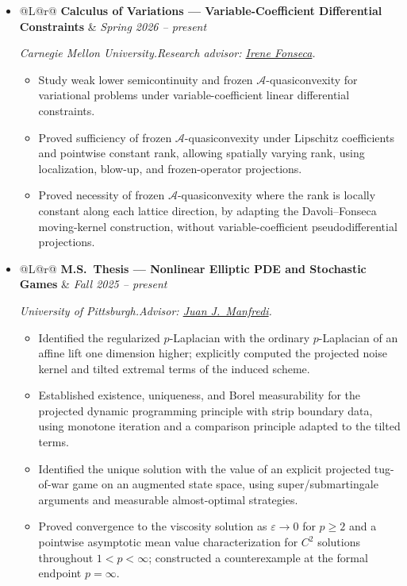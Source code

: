 \documentclass[11pt,letterpaper]{article}
\makeatletter
\newenvironment{cventries}
  {\begin{itemize}[label={},leftmargin=0pt,itemsep=0.40em,topsep=0.30em,
                   parsep=0pt,partopsep=0pt]}
  {\end{itemize}}
\newenvironment{cvbullets}
  {\begin{itemize}[label=\raisebox{0.20ex}{\scriptsize$\bullet$},
                   leftmargin=1.5em,itemsep=0.20em,topsep=0.22em,
                   parsep=0pt,partopsep=0pt]}
  {\end{itemize}}
\newcommand{\cvline}[2]{%
  \begin{tabularx}{\linewidth}{@{}L@{\hspace{1.5em}}r@{}}
    #1 & #2
  \end{tabularx}\par}
\newcommand{\factsep}{\hspace{0.6em}}
\newcommand{\roleentry}[3]{%
  \item \cvline{\textbf{#1}}{\textit{#2}}%
        \vspace{0.12em}\par{\small\sloppy\textit{#3}}\par}
\makeatother
\begin{document}
\begin{cventries}
  \roleentry{Calculus of Variations --- Variable-Coefficient Differential Constraints}
            {Spring 2026 -- present}
            {Carnegie Mellon University.\factsep Research advisor:
             \href{https://irenefonseca.weebly.com}{Irene Fonseca}.}
\begin{cvbullets}
  \item Study weak lower semicontinuity and frozen
        $\mathscr{A}$-quasiconvexity for variational problems under
        variable-coefficient linear differential constraints.
  \item Proved sufficiency of frozen $\mathscr{A}$-quasiconvexity
        under Lipschitz coefficients and pointwise constant rank,
        allowing spatially varying rank, using localization,
        blow-up, and frozen-operator projections.
  \item Proved necessity of frozen $\mathscr{A}$-quasiconvexity
        where the rank is locally constant along each lattice direction,
        by adapting the Davoli--Fonseca moving-kernel construction, without
        variable-coefficient pseudodifferential projections.
\end{cvbullets}

  \roleentry{M.S.\ Thesis --- Nonlinear Elliptic PDE and Stochastic Games}
            {Fall 2025 -- present}
            {University of Pittsburgh.\factsep Advisor:
             \href{https://sites.pitt.edu/~manfredi/}{Juan J.\ Manfredi}.}
  \begin{cvbullets}
    \item Identified the regularized $p$-Laplacian with the ordinary
          $p$-Laplacian of an affine lift one dimension higher; explicitly
          computed the projected noise kernel and tilted extremal terms
          of the induced scheme.
    \item Established existence, uniqueness, and Borel measurability for
          the projected dynamic programming principle with strip boundary
          data, using monotone iteration and a comparison principle
          adapted to the tilted terms.
    \item Identified the unique solution with the value of an explicit
          projected tug-of-war game on an augmented state space, using
          super/submartingale arguments and measurable almost-optimal
          strategies.
    \item Proved convergence to the viscosity solution as $\varepsilon\to 0$
          for $p\ge 2$ and a pointwise asymptotic mean value characterization
          for $C^2$ solutions throughout $1<p<\infty$; constructed a
          counterexample at the formal endpoint $p=\infty$.
  \end{cvbullets}
\end{cventries}
\end{document}
